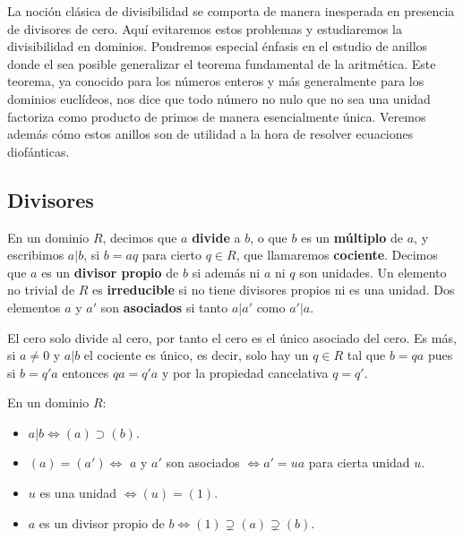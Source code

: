 
La noción clásica de divisibilidad se comporta de manera inesperada en
presencia de divisores de cero. Aquí evitaremos estos problemas y
estudiaremos la divisibilidad en dominios. Pondremos especial énfasis en
el estudio de anillos donde el sea posible generalizar el teorema
fundamental de la aritmética. Este teorema, ya conocido para los números
enteros y más generalmente para los dominios euclídeos, nos dice que
todo número no nulo que no sea una unidad factoriza como producto de
primos de manera esencialmente única. Veremos además cómo estos anillos
son de utilidad a la hora de resolver ecuaciones diofánticas.

\hypertarget{divisores}{%
\subsection{Divisores}\label{divisores}}


En un dominio \(R\), decimos que \(a\) \textbf{divide} a \(b\), o que
\(b\) es un \textbf{múltiplo} de \(a\), y escribimos \(a|b\), si
\(b=aq\) para cierto \(q\in R\), que llamaremos \textbf{cociente}.
Decimos que \(a\) es un \textbf{divisor propio} de \(b\) si además ni
\(a\) ni \(q\) son unidades. Un elemento no trivial de \(R\) es
\textbf{irreducible} si no tiene divisores propios ni es una unidad. Dos
elementos \(a\) y \(a'\) son \textbf{asociados} si tanto \(a| a'\) como
\(a'|a\). 


El cero solo divide al cero, por tanto el cero es el único asociado del
cero. Es más, si \(a\neq 0\) y \(a|b\) el cociente es único, es decir,
solo hay un \(q\in R\) tal que \(b=qa\) pues si \(b=q'a\) entonces
\(qa=q'a\) y por la propiedad cancelativa \(q=q'\). 


En un dominio \(R\):

\begin{itemize}
\item
  \(a|b \Leftrightarrow (a)\supset (b)\).
\item
  \((a)=(a')\Leftrightarrow\) \(a\) y \(a'\) son asociados
  \(\Leftrightarrow a'=ua\) para cierta unidad \(u\).
\item
  \(u\) es una unidad \(\Leftrightarrow (u)=(1)\).
\item
  \(a\) es un divisor propio de
  \(b \Leftrightarrow (1)\supsetneq (a)\supsetneq (b)\).
\end{itemize}

